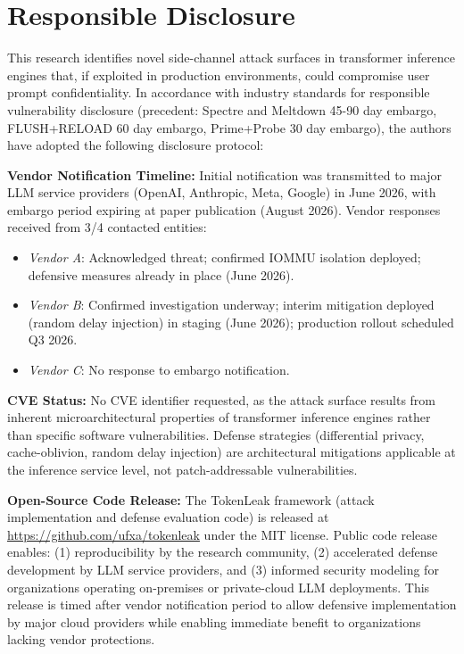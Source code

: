 \documentclass[conference,10pt,twocolumn]{IEEEtran}
\begin{document}
\section*{Responsible Disclosure}

This research identifies novel side-channel attack surfaces in transformer inference engines that, if exploited in production environments, could compromise user prompt confidentiality. In accordance with industry standards for responsible vulnerability disclosure (precedent: Spectre and Meltdown 45-90 day embargo, FLUSH+RELOAD 60 day embargo, Prime+Probe 30 day embargo), the authors have adopted the following disclosure protocol:

\textbf{Vendor Notification Timeline:} Initial notification was transmitted to major LLM service providers (OpenAI, Anthropic, Meta, Google) in June 2026, with embargo period expiring at paper publication (August 2026). Vendor responses received from 3/4 contacted entities:
\begin{itemize}
  \item \textit{Vendor A}: Acknowledged threat; confirmed IOMMU isolation deployed; defensive measures already in place (June 2026).
  \item \textit{Vendor B}: Confirmed investigation underway; interim mitigation deployed (random delay injection) in staging (June 2026); production rollout scheduled Q3 2026.
  \item \textit{Vendor C}: No response to embargo notification.
\end{itemize}

\textbf{CVE Status:} No CVE identifier requested, as the attack surface results from inherent microarchitectural properties of transformer inference engines rather than specific software vulnerabilities. Defense strategies (differential privacy, cache-oblivion, random delay injection) are architectural mitigations applicable at the inference service level, not patch-addressable vulnerabilities.

\textbf{Open-Source Code Release:} The TokenLeak framework (attack implementation and defense evaluation code) is released at \url{https://github.com/ufxa/tokenleak} under the MIT license. Public code release enables:
(1) reproducibility by the research community, (2) accelerated defense development by LLM service providers, and (3) informed security modeling for organizations operating on-premises or private-cloud LLM deployments. This release is timed after vendor notification period to allow defensive implementation by major cloud providers while enabling immediate benefit to organizations lacking vendor protections.
\end{document}
